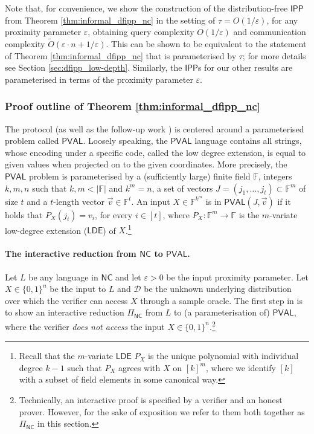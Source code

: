 \documentclass[11pt]{article}
\newcommand{\NC}{\mathsf{NC}}
\newcommand{\PVAL}{\mathsf{PVAL}}
\newcommand{\IPP}{\mathsf{IPP}}
\newcommand{\LDE}{\mathsf{LDE}}
\newcommand{\F}{\mathbb{F}}
\newcommand{\sD}{\mathcal{D}}
\newcommand{\eps}{\varepsilon}
\begin{document}
Note that, for convenience, we show the construction of the distribution-free $\IPP$ from Theorem \ref{thm:informal_dfipp_nc} in the setting of $\tau = O(1/\eps)$, for any proximity parameter $\varepsilon$, obtaining query complexity $O(1/\eps)$ and communication complexity $\tilde{O}(\varepsilon\cdot n + 1/\eps)$. This can be shown to be equivalent to the statement of Theorem \ref{thm:informal_dfipp_nc} that is parameterised by $\tau$; for more details see Section \ref{sec:dfipp_low-depth}. Similarly, the $\IPP$s for our other results are parameterised in terms of the proximity parameter $\eps$.

\subsubsection{Proof outline of Theorem \ref{thm:informal_dfipp_nc}}
\label{sec:tech_main_dfipp}
The \cite{RVW} protocol (as well as the follow-up work \cite{RR20_batch_polylog}) is centered around a parameterised problem called $\PVAL$. Loosely speaking, the $\PVAL$ language contains all strings, whose encoding under a specific code, called the low degree extension, is equal to given values when projected on to the given coordinates. More precisely, the $\PVAL$ problem is parameterised by a (sufficiently large) finite field $\F$, integers $k,m,n$ such that $k,m < \vert \F \vert$ and $k^m = n$, a set of vectors $J = (j_1, \dots, j_t) \subset \F^m$ of size $t$ and a $t$-length vector $\Vec{v} \in \F^t$. An input $X \in \F^{k^m}$ is in $\PVAL(J,\Vec{v})$ if it holds that $P_X(j_i) = v_i$, for every $i \in [t]$, where $P_X:\F^m \rightarrow \F$ is the $m$-variate low-degree extension ($\LDE$) of $X$.\footnote{Recall that the $m$-variate $\LDE$ $P_X$ is the unique polynomial with individual degree $k-1$ such that $P_X$ agrees with $X$ on $[k]^m$, where we identify $[k]$ with a subset of field elements in some canonical way.}

\paragraph*{The interactive reduction from $\NC$ to $\PVAL$.} Let $L$ be any language in $\NC$ and let $\eps > 0$ be the input proximity parameter. Let $X \in \{0,1\}^n$ be the input to $L$ and $\sD$ be the unknown underlying distribution over which the verifier can access $X$ through a sample oracle. The first step in \cite{RVW} is to show an interactive reduction $\Pi_{\NC}$ from $L$ to (a parameterisation of) $\PVAL$, where the verifier \emph{does not access} the input $X \in \{0,1\}^n$.\footnote{Technically, an interactive proof is specified by a verifier and an honest prover. However, for the sake of exposition we refer to them both together as $\Pi_{\NC}$ in this section.} 
\end{document}
